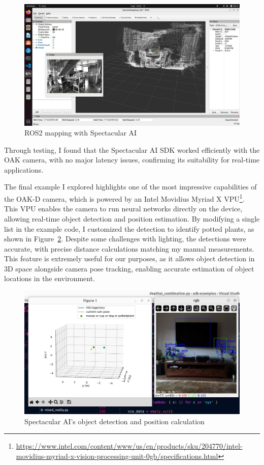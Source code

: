 \begin{figure}[htbp]
	\centering
	\includegraphics[width=150mm, keepaspectratio]{figures_jpg/spectacular_ai_mapping_ros2.jpg}
	\caption{ROS2 mapping with Spectacular AI}
	\label{fig:SPAI_ros_mapping}
\end{figure}

Through testing, I found that the Spectacular AI SDK worked efficiently with the OAK camera, with no major latency issues, confirming its suitability for real-time applications.

The final example I explored highlights one of the most impressive capabilities of the OAK-D camera, which is powered by an Intel Movidius Myriad X VPU\footnote{\url{https://www.intel.com/content/www/us/en/products/sku/204770/intel-movidius-myriad-x-vision-processing-unit-0gb/specifications.html}}. This VPU enables the camera to run neural networks directly on the device, allowing real-time object detection and position estimation. By modifying a single list in the example code, I customized the detection to identify potted plants, as shown in Figure~\ref{fig:SPAI_depthai}. Despite some challenges with lighting, the detections were accurate, with precise distance calculations matching my manual measurements. This feature is extremely useful for our purposes, as it allows object detection in 3D space alongside camera pose tracking, enabling accurate estimation of object locations in the environment.

\begin{figure}[htbp]
	\centering
	\includegraphics[width=150mm, keepaspectratio]{figures_jpg/spectacular_ai_depthai_combination.jpg}
	\caption{Spectacular AI's object detection and position calculation}
	\label{fig:SPAI_depthai}
\end{figure}


